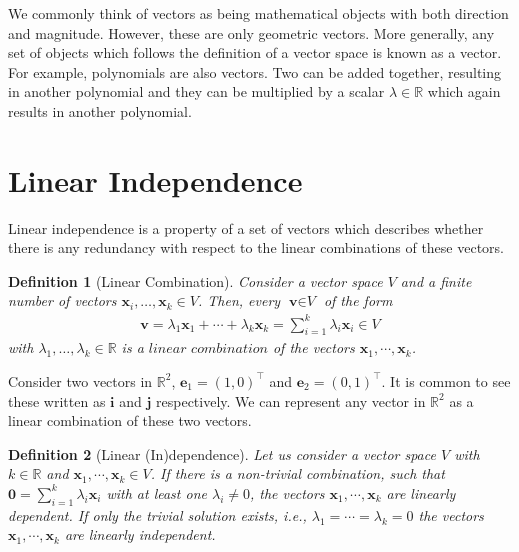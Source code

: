 \documentclass[a4paper,12pt]{book}
\newcommand{\vectr}[1]{\textbf{#1}}
\newcommand{\real}{\mathbb{R}}
\newcommand{\italic}[1]{\textit{#1}}
\newtheorem{definition}{Definition}[section]
\begin{document}
	We commonly think of vectors as being mathematical objects with both direction and magnitude. However, these are only geometric vectors. More generally, any set of objects which follows the definition of a vector space is known as a vector. For example, polynomials are also vectors. Two can be added together, resulting in another polynomial and they can be multiplied by a scalar $ \lambda \in \real $ which again results in another polynomial. 
	
	
	
	\section{Linear Independence}
	Linear independence \cite[page 40]{mml_book} is a property of a set of vectors which describes whether there is any redundancy with respect to the linear combinations of these vectors. 
	\begin{definition}[Linear Combination]
		\normalfont	Consider a vector space $\italic{V}$ and a finite number of vectors $\vectr{x}_i,\ldots,\vectr{x}_k \in \italic{V}$. Then, every $\vectr{v} \in \italic{V}$ of the form
		\begin{align}
			\vectr{v} = \lambda_1\vectr{x}_1 + \cdots + \lambda_k\vectr{x}_k =  \sum_{i=1}^{k} \lambda_i\vectr{x}_i \in \italic{V}
		\end{align}
		with $\lambda_1,\ldots,\lambda_k \in \real$ is a $\italic{linear combination}$ of the vectors $\vectr{x}_1,\cdots,\vectr{x}_k$.
		\label{def:linear_combinations}
	\end{definition}
	Consider two vectors in $ \real^2 $, $\vectr{e}_1 = (1, 0)^{\top}$ and $\vectr{e}_2 = (0, 1)^{\top}$. It is common to see these written as $ \vectr{i} $ and $ \vectr{j} $ respectively. We can represent any vector in $ \real^2 $ as a linear combination of these two vectors. 
	\begin{definition}[Linear (In)dependence] 
		\normalfont Let us consider a vector space $\italic{V}$ with $k \in \real$ and  $\vectr{x}_1,\cdots,\vectr{x}_k \in \italic{V}$. If there is a non-trivial combination, such that $\vectr{0} = \sum_{i=1}^{k} \lambda_i\vectr{x}_i$ with at least one $\lambda_i \ne 0$, the vectors  $\vectr{x}_1,\cdots,\vectr{x}_k$ are \italic{linearly dependent}. If only the trivial solution exists, i.e., $ \lambda_1 = \cdots = \lambda_k = 0 $ the vectors $\vectr{x}_1,\cdots,\vectr{x}_k $ are \italic{linearly independent}.
		\label{def:linear_independence}
	\end{definition}
\end{document}
